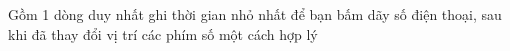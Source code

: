 Gồm 1 dòng duy nhất ghi thời gian nhỏ nhất để bạn bấm dãy số điện thoại, sau khi đã thay đổi vị trí các phím số một cách hợp lý